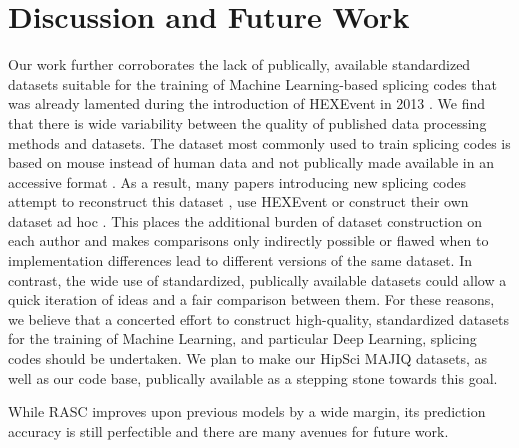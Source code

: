 \section{Discussion and Future Work}
Our work further corroborates 
the lack of publically, available standardized datasets suitable for the training of Machine Learning-based splicing codes that was already lamented during the introduction of HEXEvent in 2013 \cite{hexevent}. We find that there is wide variability between the quality of published data processing methods and datasets.
The dataset most commonly used to train splicing codes is based on mouse instead of human data and not publically made available in an accessive format \cite{jha}. As a result, many papers introducing new splicing codes attempt to reconstruct this dataset \cite{d2vsplicing}, use HEXEvent \cite{dsc} or construct their own dataset ad hoc \cite{cossmo}. This places the additional burden of dataset construction on each author and makes comparisons only indirectly possible or flawed when to implementation differences lead to different versions of the same dataset. %
In contrast, the wide use of standardized, publically available datasets could allow a quick iteration of ideas and a fair comparison between them. 
For these reasons, we believe that a concerted effort to construct high-quality, standardized datasets for the training of Machine Learning, and particular Deep Learning, splicing codes should be undertaken. We plan to make our HipSci MAJIQ datasets, as well as our code base, publically available as a stepping stone towards this goal.


While RASC improves upon previous models by a wide margin, its prediction accuracy is still perfectible and there are many avenues for future work. 

